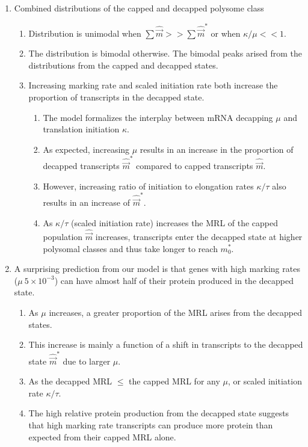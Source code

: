 \documentclass[review]{elsarticle}
\newcommand{\mvec}{\ensuremath{\vec{m}}\xspace}
\newcommand{\mvechat}{\ensuremath{\hat{\mvec}}\xspace}
\newcommand{\mvechatstar}{\ensuremath{\mvechat^*}\xspace}
\begin{document}
\begin{enumerate}
\begin{enumerate}
\begin{enumerate}
\begin{enumerate}
      \end{enumerate}
    \end{enumerate}
  \item Combined distributions of the capped and decapped polysome class
    \begin{enumerate}      
    \item Distribution is unimodal when $\sum \mvechat >> \sum \mvechatstar$ or when $\kappa/\mu <<1$.
    \item The distribution is bimodal otherwise. The bimodal peaks arised from the distributions from the capped and decapped states. 
    \item Increasing marking rate and scaled initiation rate both increase the proportion of transcripts in the decapped state.
      \begin{enumerate}
      \item The model formalizes the interplay between mRNA decapping $\mu$ and translation initiation $\kappa$. 
      \item As expected, increasing $\mu$ results in an increase in the proportion of decapped transcripts \mvechatstar compared to capped transcripts \mvechat.
      \item However, increasing ratio of initiation to elongation rates $\kappa/\tau$ also results in an increase of \mvechatstar.
      \item As $\kappa/\tau$ (scaled initiation rate) increases the MRL of the capped population \mvechat increases, transcripts enter the decapped state at higher polysomal classes and thus take longer to reach $m_0^*$.
      \end{enumerate}
    \end{enumerate}
  \item A surprising prediction from our model is that genes with  high marking rates ($\mu ~ 5 \times 10^{-3}$) can have almost half of their protein produced in the decapped state.
    \begin{enumerate}
      \item As $\mu$ increases, a greater proportion of the MRL arises from the decapped states.
      \item This increase is mainly a function of a shift in transcripts to the decapped state \mvechatstar due to larger $\mu$.
	\item As the decapped MRL $\leq$ the capped MRL for any $\mu$, or scaled initiation rate $\kappa / \tau$.   
      \item The high relative protein production from the decapped state suggests that high marking rate transcripts can produce more protein than expected from their capped MRL alone.


\end{enumerate}
\end{enumerate}
\end{enumerate}
\end{document}
